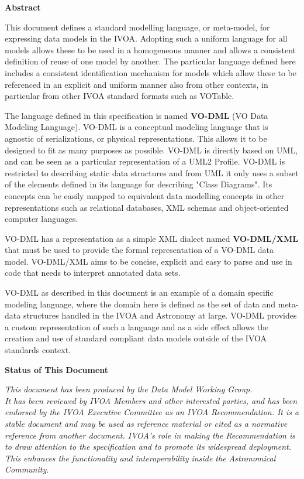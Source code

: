 \documentclass[10pt,a4paper]{ivoa}
\begin{document}
\textbf{Abstract}

This document defines a standard modelling language, or meta-model, for
expressing data models in the IVOA. Adopting such a uniform language for
all models allows these to be used in a homogeneous manner and allows a
consistent definition of reuse of one model by another. The particular
language defined here includes a consistent identification mechanism for
models which allow these to be referenced in an explicit and uniform
manner also from other contexts, in particular from other IVOA standard
formats such as VOTable.

The language defined in this specification is named \textbf{VO-DML} (VO
Data Modeling Language). VO-DML is a conceptual modeling language that
is agnostic of serializations, or physical representations. This allows
it to be designed to fit as many purposes as possible. VO-DML is
directly based on UML, and can be seen as a particular representation of
a UML2 Profile. VO-DML is restricted to describing static data
structures and from UML it only uses a subset of the elements defined in
its language for describing "Class Diagrams". Its concepts can be easily
mapped to equivalent data modelling concepts in other representations
such as relational databases, XML schemas and object-oriented computer
languages.

VO-DML has a representation as a simple XML dialect named
\textbf{VO-DML/XML} that must be used to provide the formal
representation of a VO-DML data model. VO-DML/XML aims to be concise,
explicit and easy to parse and use in code that needs to interpret
annotated data sets.

VO-DML as described in this document is an example of a domain specific
modeling language, where the domain here is defined as the set of data
and meta-data structures handled in the IVOA and Astronomy at large.
VO-DML provides a custom representation of such a language and as a side
effect allows the creation and use of standard compliant data models
outside of the IVOA standards context.

\textbf{Status of This Document}

\emph{This document has been produced by the Data Model Working Group.\\
It has been reviewed by IVOA Members and other interested parties, and
has been endorsed by the IVOA Executive Committee as an IVOA
Recommendation. It is a stable document and may be used as reference
material or cited as a normative reference from another document. IVOA's
role in making the Recommendation is to draw attention to the
specification and to promote its widespread deployment. This enhances
the functionality and interoperability inside the Astronomical
Community.}
\end{document}
